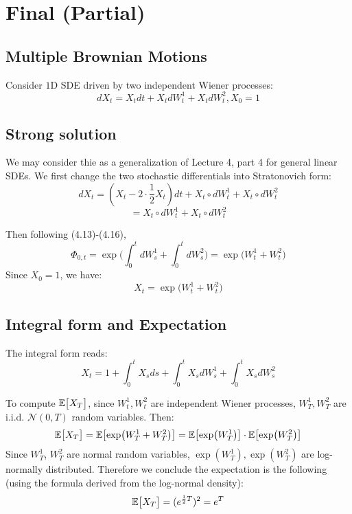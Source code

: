 \documentclass{article}
\begin{document}


\section{Final (Partial)}
\subsection{Multiple Brownian Motions}
Consider $1$D SDE driven by two independent Wiener processes:
\begin{equation}
    dX_t = X_tdt + X_tdW_t^1 + X_tdW_t^2, X_0 = 1
\end{equation}
\subsection{Strong solution} We may consider thie as a generalization of Lecture 4, part 4 for general linear SDEs. We first change the two stochastic differentials into Stratonovich form:
\begin{equation}
    dX_t = (X_t - 2\cdot\frac12X_t)dt + X_t\circ dW_t^1 + X_t\circ dW_t^2
\end{equation}
$$
     = X_t\circ dW_t^1 + X_t\circ dW_t^2
$$

Then following (4.13)-(4.16), 
$$
    \Phi_{0,t} = \exp\bigg(
        \int_0^tdW_s^1 + \int_0^tdW_s^2
    \bigg) = \exp\bigg(
        W_t^1 + W_t^2
    \bigg)
$$ Since $X_0=1$, we have:
\begin{equation}
    X_t = \exp\bigg(
        W_t^1 + W_t^2
    \bigg)
\end{equation}

\subsection{Integral form and Expectation} The integral form reads:
$$
    X_t = 1 + \int_0^tX_sds + \int_0^tX_sdW_s^1 + \int_0^tX_sdW_s^2
$$

To compute $\mathbb{E}\big[ {X_T} \big]$, since $W_t^1,W_t^2$ are independent Wiener processes, $W_T^1, W_T^2$ are i.i.d. $\mathcal{N}(0,T)$ random variables. Then:
\begin{equation}
    \mathbb{E}\big[ {X_T} \big] = \mathbb{E}\big[ {\exp(W_T^1+W_T^2)} \big] = \mathbb{E}\big[ {\exp(W_T^1)} \big]\cdot\mathbb{E}\big[ {\exp(W_T^2)} \big]
\end{equation} Since $W_T^1$, $W_T^2$ are normal random variables, $\exp(W_T^1),\exp(W_T^2)$ are log-normally distributed. Therefore we conclude the expectation is the following (using the formula derived from the log-normal density):
\begin{equation}
    \mathbb{E}\big[ {X_T} \big] = (e^{\frac12T})^2 = e^T
\end{equation}
\end{document}
